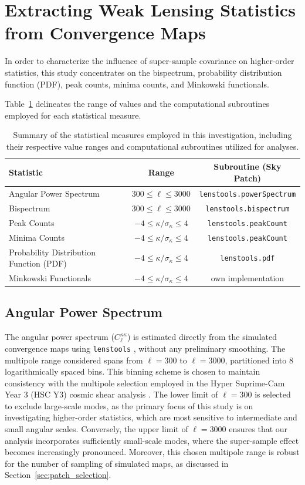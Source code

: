 \section{Extracting Weak Lensing Statistics from Convergence Maps}
In order to characterize the influence of super-sample covariance on higher-order statistics, this study concentrates on the bispectrum, probability distribution function (PDF), peak counts, minima counts, and Minkowski functionals. 

Table~\ref{tab:statistics} delineates the range of values and the computational subroutines employed for each statistical measure. 
\begin{table}[htbp]
    \centering
    \begin{tabular}{lcc}
    \toprule
    \textbf{Statistic} & \textbf{Range} & \textbf{Subroutine (Sky Patch)} \\
    \midrule
    Angular Power Spectrum & $300 \leq \ell \leq 3000$ & \texttt{lenstools.powerSpectrum} \\
    Bispectrum & $300 \leq \ell \leq 3000$ & \texttt{lenstools.bispectrum} \\
    Peak Counts & $-4 \leq \kappa/\sigma_\kappa \leq 4$ & \texttt{lenstools.peakCount} \\
    Minima Counts & $-4 \leq \kappa/\sigma_\kappa \leq 4$ & \texttt{lenstools.peakCount} \\
    Probability Distribution Function (PDF) & $-4 \leq \kappa/\sigma_\kappa \leq 4$ & \texttt{lenstools.pdf} \\
    Minkowski Functionals & $-4 \leq \kappa/\sigma_\kappa \leq 4$ & own implementation \\
    \bottomrule
    \end{tabular}
    \caption{Summary of the statistical measures employed in this investigation, including their respective value ranges and computational subroutines utilized for analyses.}\label{tab:statistics}
\end{table}

\subsection{Angular Power Spectrum}
The angular power spectrum ($C_{\ell}^{\kappa\kappa}$) is estimated directly from the simulated convergence maps using \texttt{lenstools} \citep{2016A&C....17...73P}, without any preliminary smoothing. The multipole range considered spans from $\ell = 300$ to $\ell = 3000$, partitioned into $8$ logarithmically spaced bins. This binning scheme is chosen to maintain consistency with the multipole selection employed in the Hyper Suprime-Cam Year 3 (HSC Y3) cosmic shear analysis \citep{2023PhRvD.108l3519D}. The lower limit of $\ell = 300$ is selected to exclude large-scale modes, as the primary focus of this study is on investigating higher-order statistics, which are most sensitive to intermediate and small angular scales. Conversely, the upper limit of $\ell = 3000$ ensures that our analysis incorporates sufficiently small-scale modes, where the super-sample effect becomes increasingly pronounced. Moreover, this chosen multipole range is robust for the number of sampling of simulated maps, as discussed in Section~\ref{sec:patch_selection}.

